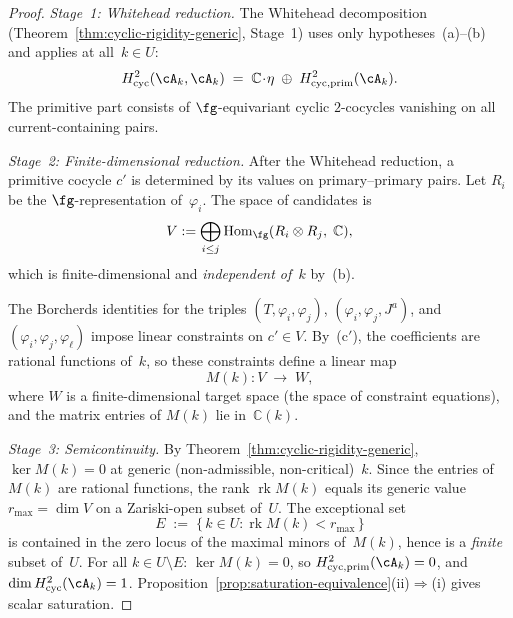 \begin{proof}
\emph{Stage~1: Whitehead reduction.}
The Whitehead decomposition
(Theorem~\ref{thm:cyclic-rigidity-generic}, Stage~1) uses only
hypotheses~(a)--(b) and applies at all~$k \in U$:
\begin{equation}\label{eq:whitehead-family}
H^2_{\mathrm{cyc}}({\cA}_k, {\cA}_k)
\;=\;
\mathbb{C}\!\cdot\!\eta
\;\oplus\;
H^2_{\mathrm{cyc,prim}}({\cA}_k).
\end{equation}
The primitive part consists of $\fg$-equivariant cyclic
$2$-cocycles vanishing on all current-containing pairs.

\medskip
\emph{Stage~2: Finite-dimensional reduction.}
After the Whitehead reduction, a primitive cocycle $c'$ is
determined by its values on primary--primary pairs.  Let
$R_i$ be the $\fg$-representation of~$\varphi_i$.  The space
of candidates is
\[
V := \bigoplus_{i \leq j} \operatorname{Hom}_{\fg}(R_i \otimes R_j,\;
\mathbb{C}),
\]
which is finite-dimensional and \emph{independent of\/~$k$}
by~(b).

The Borcherds identities for the triples
$(T, \varphi_i, \varphi_j)$,
$(\varphi_i, \varphi_j, J^a)$, and
$(\varphi_i, \varphi_j, \varphi_\ell)$
impose linear constraints on $c' \in V$.
By~(c$'$), the coefficients are rational functions
of\/~$k$, so these constraints define a linear map
\[
M(k)\colon V \;\longrightarrow\; W,
\]
where $W$ is a finite-dimensional target space (the space
of constraint equations), and the matrix entries of $M(k)$
lie in~$\mathbb{C}(k)$.

\medskip
\emph{Stage~3: Semicontinuity.}
By Theorem~\ref{thm:cyclic-rigidity-generic},
$\ker M(k) = 0$ at generic (non-admissible, non-critical)~$k$.
Since the entries of~$M(k)$ are rational functions, the rank
$\operatorname{rk} M(k)$ equals its generic value
$r_{\max} = \dim V$ on a Zariski-open subset of~$U$.
The exceptional set
\[
E \;:=\; \bigl\{\, k \in U : \operatorname{rk} M(k) < r_{\max} \,\bigr\}
\]
is contained in the zero locus of the maximal minors
of~$M(k)$, hence is a \emph{finite} subset of~$U$.
For all $k \in U \setminus E$:
$\ker M(k) = 0$, so
$H^2_{\mathrm{cyc,prim}}({\cA}_k) = 0$,
and $\dim H^2_{\mathrm{cyc}}({\cA}_k) = 1$.
Proposition~\ref{prop:saturation-equivalence}(ii)$\Rightarrow$(i)
gives scalar saturation.
\end{proof}

